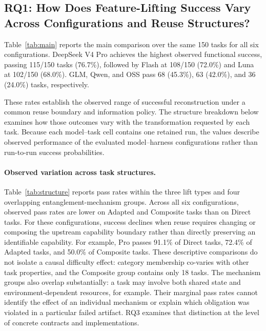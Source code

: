 \documentclass[acmsmall,screen,review,anonymous]{acmart}
\begin{document}
\subsection{RQ1: How Does Feature-Lifting Success Vary Across Configurations and Reuse Structures?}
\label{sec:rq1}

Table~\ref{tab:main} reports the main comparison over the same 150 tasks for all
six configurations. DeepSeek V4 Pro achieves the highest observed functional
success, passing 115/150 tasks (76.7\%), followed by Flash at 108/150 (72.0\%)
and Luna at 102/150 (68.0\%). GLM, Qwen, and OSS pass 68 (45.3\%), 63 (42.0\%),
and 36 (24.0\%) tasks, respectively.

These rates establish the observed range of successful reconstruction under a
common reuse boundary and information policy. The structure breakdown below
examines how those outcomes vary with the transformation requested by each task.
Because each model--task cell contains one retained run, the values describe
observed performance of the evaluated model--harness configurations rather than
run-to-run success probabilities.




\paragraph{Observed variation across task structures.}
Table~\ref{tab:structure} reports pass rates within the three lift types
and four overlapping entanglement-mechanism groups. Across all six configurations, observed pass rates are lower on Adapted
and Composite tasks than on Direct tasks.
For these configurations, success declines when reuse requires changing or
composing the upstream capability boundary rather than directly preserving an
identifiable capability. For example, Pro passes 91.1\% of Direct tasks,
72.4\% of Adapted tasks, and 50.0\% of Composite tasks.
These descriptive comparisons do not isolate a causal difficulty effect:
category membership co-varies with other task properties, and the Composite
group contains only 18 tasks.
The mechanism groups also overlap substantially: a task may involve both shared
state and environment-dependent resources, for example. Their marginal pass rates
cannot identify the effect of an individual mechanism or explain which obligation
was violated in a particular failed artifact. RQ3 examines that distinction at
the level of concrete contracts and implementations.
\end{document}
